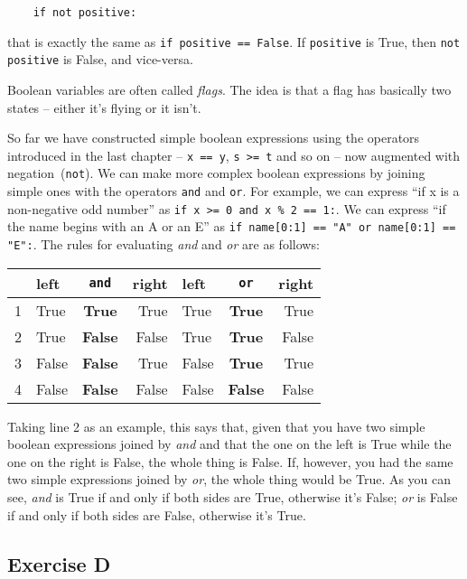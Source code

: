 \begin{Verbatim}
    if not positive:
\end{Verbatim}

that is exactly the same as \texttt{if positive == False}. If
\texttt{positive} is True, then \texttt{not positive} is False, and
vice-versa.

Boolean variables are often called \emph{flags}.  The idea is that
a flag has basically two states -- either it's flying or it isn't.

So far we have constructed simple boolean expressions using the operators
introduced in the last chapter -- \texttt{x == y}, \texttt{s >= t} and so on --
now augmented with negation~(\verb+not+).
We can make more complex boolean expressions by joining simple ones
with the operators \verb!and! and \verb!or!.  For example,
we can express ``if x is a non-negative odd number'' as
\verb+if x >= 0 and x % 2 == 1:+. We can express ``if the name begins
with an A or an E'' as \texttt{if name[0:1] == "A" or
  name[0:1] == "E":}.  The rules for evaluating \emph{and}
and \emph{or} are as follows:

\vspace{1em}
\begin{tabular}{|l|lcr||lcr|}
\hline
& left & \verb!and! & right & left & \verb+or+ & right\\
\hline
\hline
1 & True & \textbf{True} & True&True&\textbf{True}&True\\
2 & True & \textbf{False} & False&True&\textbf{True}&False\\
3 & False & \textbf{False} & True&False&\textbf{True}&True\\
4 & False & \textbf{False} & False&False&\textbf{False}&False\\
\hline
\end{tabular}
\vspace{1em}

Taking line 2 as an example, this says that, given that you have two simple
boolean expressions joined by \emph{and} and that the one on the left is
True while the one on the right is False, the whole thing is False.  If,
however, you had the same two simple expressions joined by \emph{or}, the
whole thing would be True. As you can see, \emph{and} is True if and
only if both sides are True, otherwise it's False; \emph{or} is False
if and only if both sides are False, otherwise it's True.

\subsection*{Exercise D}


